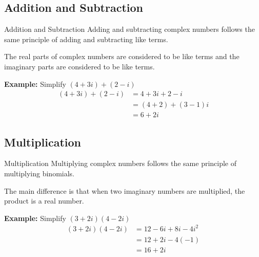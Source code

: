 \documentclass{beamer}
\begin{document}
\subsection{Addition and Subtraction}
\begin{frame}{Addition and Subtraction}
    Adding and subtracting complex numbers follows the same principle of adding and subtracting like terms. \newline
    
    The real parts of complex numbers are considered to be like terms and the imaginary parts are considered to be like terms. \newline

    \textbf{Example:} Simplify $(4 + 3i) + (2 - i)$
    \begin{align*}
        (4 + 3i) + (2 - i) &= 4 + 3i + 2 - i \\
        &= (4 + 2) + (3 - 1)i \\
        &= 6 + 2i
    \end{align*}
\end{frame}

\subsection{Multiplication}
\begin{frame}{Multiplication}
    Multiplying complex numbers follows the same principle of multiplying binomials. \newline
    
    The main difference is that when two imaginary numbers are multiplied, the product is a real number. \newline

    \textbf{Example:} Simplify $(3 + 2i)(4 - 2i)$
    \begin{align*}
        (3 + 2i)(4 - 2i) &= 12 - 6i + 8i - 4i^2 \\
        &= 12 + 2i -4(-1) \\
        &= 16 + 2i
    \end{align*}
\end{frame}
\end{document}
